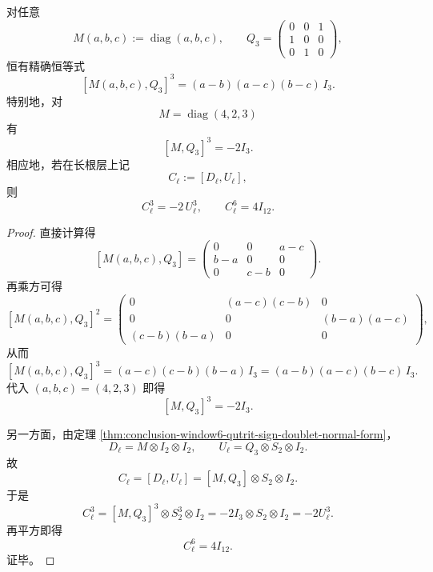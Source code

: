 \begin{theorem}[三次中心关系]\label{thm:conclusion-window6-cubic-central-relation}
对任意
\[
M(a,b,c):=\operatorname{diag}(a,b,c),
\qquad
Q_3=
\begin{pmatrix}
0&0&1\\
1&0&0\\
0&1&0
\end{pmatrix},
\]
恒有精确恒等式
\[
[M(a,b,c),Q_3]^3=(a-b)(a-c)(b-c)\,I_3.
\]
特别地，对
\[
M=\operatorname{diag}(4,2,3)
\]
有
\[
[M,Q_3]^3=-2I_3.
\]
相应地，若在长根层上记
\[
C_{\ell}:=[D_{\ell},U_{\ell}],
\]
则
\[
C_{\ell}^3=-2\,U_{\ell}^3,
\qquad
C_{\ell}^6=4I_{12}.
\]
\end{theorem}
\begin{proof}
直接计算得
\[
[M(a,b,c),Q_3]
=
\begin{pmatrix}
0&0&a-c\\
b-a&0&0\\
0&c-b&0
\end{pmatrix}.
\]
再乘方可得
\[
[M(a,b,c),Q_3]^2
=
\begin{pmatrix}
0&(a-c)(c-b)&0\\
0&0&(b-a)(a-c)\\
(c-b)(b-a)&0&0
\end{pmatrix},
\]
从而
\[
[M(a,b,c),Q_3]^3
=(a-c)(c-b)(b-a)\,I_3
=(a-b)(a-c)(b-c)\,I_3.
\]
代入 \((a,b,c)=(4,2,3)\) 即得
\[
[M,Q_3]^3=-2I_3.
\]

另一方面，由定理 \ref{thm:conclusion-window6-qutrit-sign-doublet-normal-form}，
\[
D_{\ell}=M\otimes I_2\otimes I_2,
\qquad
U_{\ell}=Q_3\otimes S_2\otimes I_2.
\]
故
\[
C_{\ell}=[D_{\ell},U_{\ell}]=[M,Q_3]\otimes S_2\otimes I_2.
\]
于是
\[
C_{\ell}^3
=[M,Q_3]^3\otimes S_2^3\otimes I_2
=-2I_3\otimes S_2\otimes I_2
=-2U_{\ell}^3.
\]
再平方即得
\[
C_{\ell}^6=4I_{12}.
\]
证毕。
\end{proof}

